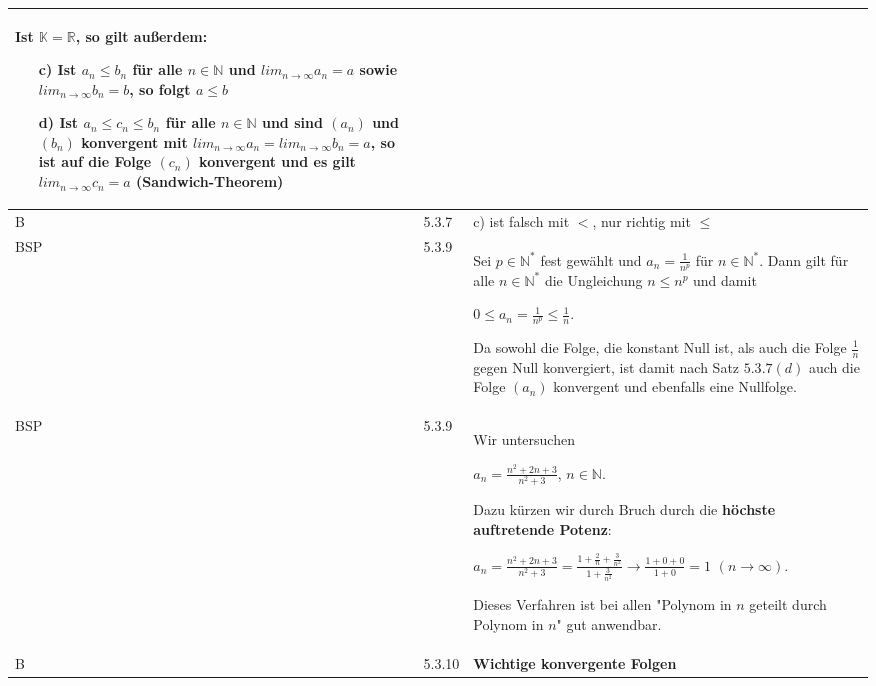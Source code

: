 \begin{longtable}{p{0.75cm} p{1cm} p{16cm}}
                        Ist $\mathbb{K} = \mathbb{R}$, so gilt außerdem:
                        \begin{itemize}[topsep=-0.5cm]
                            \item[c)] Ist $a_n \leq b_n$ für alle $n \in \mathbb{N}$ und $lim_{n \rightarrow \infty} a_n = a$ sowie 
                                        $lim_{n \rightarrow \infty} b_n = b$, so folgt $a \leq b$
                            \item[d)] Ist $a_n \leq c_n \leq b_n$ für alle $n \in \mathbb{N}$ und sind $(a_n)$ und $(b_n)$ konvergent mit
                                        $lim_{n \rightarrow \infty} a_n = lim_{n \rightarrow \infty} b_n = a$, so ist auf die Folge $(c_n)$
                                        konvergent und es gilt $lim_{n \rightarrow \infty} c_n = a$ \hfill \break
                                        \textbf{(Sandwich-Theorem)} 
                        \end{itemize} \vspace{-0cm} \\
        \midrule
        B   & 5.3.7 &   c) ist falsch mit $<$, nur richtig mit $\leq$ \\
        \midrule
        BSP & 5.3.9 &   Sei $p \in \mathbb{N^*}$ fest gewählt und $a_n = \frac{1}{n^p}$ für $n \in \mathbb{N^*}$. Dann gilt für alle
                        $n \in \mathbb{N^*}$ die Ungleichung $n \leq n^p$ und damit \hfill \break
                        \centerline{$0 \leq a_n = \frac{1}{n^p} \leq \frac{1}n{}$.}
                        Da sowohl die Folge, die konstant Null ist, als auch die Folge $\frac{1}{n}$ gegen Null konvergiert,
                        ist damit nach Satz $5.3.7(d)$ auch die Folge $(a_n)$ konvergent und ebenfalls eine Nullfolge. \\
        \midrule
        BSP & 5.3.9 &   Wir untersuchen \hfill \break
                        \centerline{$a_n = \frac{n^2 + 2n + 3}{n^2 + 3}$, $n \in \mathbb{N}$.}
                        Dazu kürzen wir durch Bruch durch die \textbf{höchste auftretende Potenz}: \hfill \break
                        \centerline{$a_n = \frac{n^2 + 2n + 3}{n^2 + 3} = \frac{1 + \frac{2}{n} + \frac{3}{n^2}}{1 + \frac{3}{n^2}} \rightarrow 
                        \frac{1+0+0}{1+0} = 1$ $(n \rightarrow \infty)$.} 
                        Dieses Verfahren ist bei allen "Polynom in $n$ geteilt durch Polynom in $n$" gut anwendbar. \\
        \midrule
        B   & 5.3.10&   \textbf{Wichtige konvergente Folgen}

\end{longtable}
